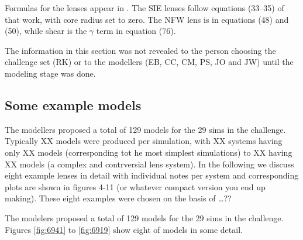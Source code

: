 Formulas for the lenses appear in \cite{2001astro.ph..2341K}. The SIE
lenses follow equations (33--35) of that work, with core radius set to
zero.  The NFW lens is in equations (48) and (50), while shear is the
$\gamma$ term in equation (76).

The information in this section was not revealed to the person
choosing the challenge set (RK) or to the modellers (EB, CC, CM, PS,
JO and JW) until the modeling stage was done.

\subsection{Some example models} \label{sec:example_models}

The modellers proposed a total of 129 models for the 29 sims in the
challenge. Typically XX models were produced per simulation, with XX
systems having only XX models (corresponding tot he most simplest
simulations) to XX having XX models (a complex and contrversial lens
system). In the following we discuss eight example lenses in detail
with individual notes per system and corresponding plots are shown in
figures 4-11 (or whatever compact version you end up making). These
eight examples were chosen on the basis of …??

The modelers proposed a total of 129 models for the 29 sims in the
challenge.  Figures \ref{fig:6941} to \ref{fig:6919} show eight of
models in some detail.

\FloatBarrier

